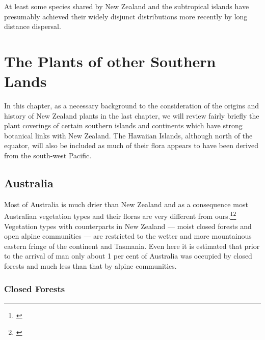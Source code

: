 At least some species shared by New Zealand and the subtropical islands have presumably achieved their widely disjunct distributions more recently by long distance dispersal.

\chapter{The Plants of other Southern Lands}

In this chapter, as a necessary background to the consideration of the origins and history of New Zealand plants in the last chapter, we will review fairly briefly the plant coverings of certain southern islands and continents which have strong botanical links with New Zealand.
The Hawaiian Islands, although north of the equator, will also be included as much of their flora appears to have been derived from the south-west Pacific.

\section{Australia}

Most of Australia is much drier than New Zealand and as a consequence most Australian vegetation types and their floras are very different from ours.\footnote{\cite{beadle1981vegetation}}\footnote{\cite{groves1981australian}} Vegetation types with counterparts in New Zealand --- moist closed forests and open alpine communities --- are restricted to the wetter and more mountainous eastern fringe of the continent and Tasmania.
Even here it is estimated that prior to the arrival of man only about 1 per cent of Australia was occupied by closed forests and much less than that by alpine communities.

\subsection{Closed Forests}

